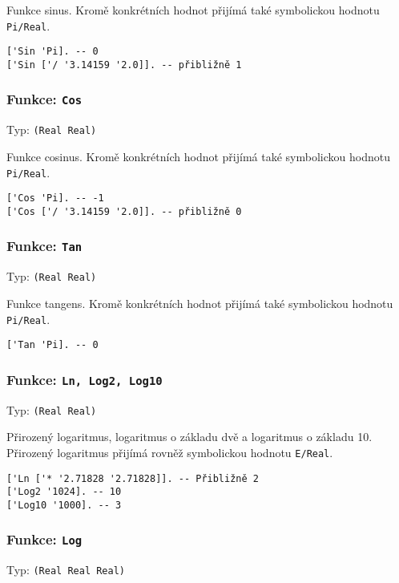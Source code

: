 Funkce sinus. Kromě konkrétních hodnot přijímá také symbolickou hodnotu \lstinline{Pi/Real}.

\begin{lstlisting}[caption={Ukázka využití Sin}]
['Sin 'Pi]. -- 0
['Sin ['/ '3.14159 '2.0]]. -- přibližně 1
\end{lstlisting}

\subsubsection*{Funkce: \lstinline{Cos}}
Typ: \lstinline{(Real Real)}

Funkce cosinus. Kromě konkrétních hodnot přijímá také symbolickou hodnotu \lstinline{Pi/Real}.

\begin{lstlisting}[caption={Ukázka využití Cos}]
['Cos 'Pi]. -- -1
['Cos ['/ '3.14159 '2.0]]. -- přibližně 0
\end{lstlisting}

\subsubsection*{Funkce: \lstinline{Tan}}
Typ: \lstinline{(Real Real)}

Funkce tangens. Kromě konkrétních hodnot přijímá také symbolickou hodnotu \lstinline{Pi/Real}.

\begin{lstlisting}[caption={Ukázka využití Tan}]
['Tan 'Pi]. -- 0
\end{lstlisting}

\subsubsection*{Funkce: \lstinline{Ln, Log2, Log10}}
Typ: \lstinline{(Real Real)}

Přirozený logaritmus, logaritmus o základu dvě a logaritmus o základu 10. Přirozený logaritmus
přijímá rovněž symbolickou hodnotu \lstinline{E/Real}.

\begin{lstlisting}[caption={Ukázka využití Ln, Log2, Log10}]
['Ln ['* '2.71828 '2.71828]]. -- Přibližně 2
['Log2 '1024]. -- 10
['Log10 '1000]. -- 3
\end{lstlisting}

\subsubsection*{Funkce: \lstinline{Log}}
Typ: \lstinline{(Real Real Real)}

